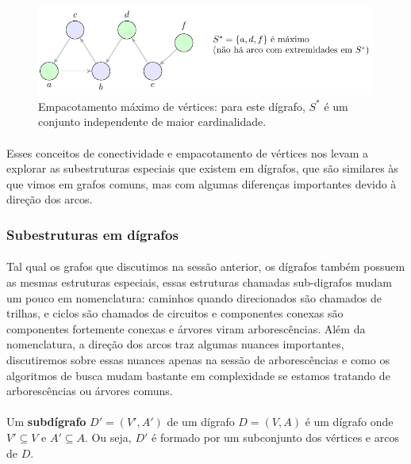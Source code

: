 \documentclass[12pt,a4paper]{article}
\begin{document}
\begin{figure}[H]
    \centering
    \includegraphics[width=0.9\linewidth]{figures/fig_empacotamento_max.pdf}

    \caption{Empacotamento máximo de vértices: para este dígrafo, $S^{*}$ é um conjunto independente de maior cardinalidade.}
    \label{fig:empacotamento-max}
    \end{figure}


\paragraph{}
Esses conceitos de conectividade e empacotamento de vértices nos levam a explorar as subestruturas especiais que existem em dígrafos, que são similares às que vimos em grafos comuns, mas com algumas diferenças importantes devido à direção dos arcos.

\subsubsection{Subestruturas em dígrafos}

\paragraph{}
Tal qual os grafos que discutimos na sessão anterior, os dígrafos também possuem as mesmas estruturas especiais, essas estruturas chamadas sub-digrafos mudam um pouco em nomenclatura: caminhos quando direcionados são chamados de trilhas, e ciclos são chamados de circuitos e componentes conexas são componentes fortemente conexas e árvores viram arborescências. Além da nomenclatura, a direção dos arcos traz algumas nuances importantes, discutiremos sobre essas nuances apenas na sessão de arborescências e como os algoritmos de busca mudam bastante em complexidade se estamos tratando de arborescências ou árvores comuns.

\paragraph{}
Um \textbf{subdígrafo} \(D' = (V', A')\) de um dígrafo \(D = (V, A)\) é um dígrafo onde \(V' \subseteq V\) e \(A' \subseteq A\). Ou seja, \(D'\) é formado por um subconjunto dos vértices e arcos de \(D\).
\end{document}
